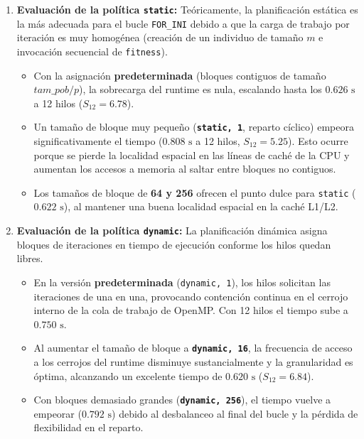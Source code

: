 \documentclass[12pt]{article}
\begin{document}
\begin{enumerate}
\begin{enumerate}
    \item \textbf{Evaluación de la política \texttt{static}:}
    Teóricamente, la planificación estática es la más adecuada para el bucle \texttt{FOR\_INI} debido a que la carga de trabajo por iteración es muy homogénea (creación de un individuo de tamaño $m$ e invocación secuencial de \texttt{fitness}). 
    \begin{itemize}
        \item Con la asignación \textbf{predeterminada} (bloques contiguos de tamaño $tam\_pob/p$), la sobrecarga del runtime es nula, escalando hasta los $0.626\text{ s}$ a 12 hilos ($S_{12} = 6.78$).
        \item Un tamaño de bloque muy pequeño (\textbf{\texttt{static, 1}}, reparto cíclico) empeora significativamente el tiempo ($0.808\text{ s}$ a 12 hilos, $S_{12} = 5.25$). Esto ocurre porque se pierde la localidad espacial en las líneas de caché de la CPU y aumentan los accesos a memoria al saltar entre bloques no contiguos.
        \item Los tamaños de bloque de \textbf{64 y 256} ofrecen el punto dulce para \texttt{static} ($0.622\text{ s}$), al mantener una buena localidad espacial en la caché L1/L2.
    \end{itemize}

    \item \textbf{Evaluación de la política \texttt{dynamic}:}
    La planificación dinámica asigna bloques de iteraciones en tiempo de ejecución conforme los hilos quedan libres.
    \begin{itemize}
        \item En la versión \textbf{predeterminada} (\texttt{dynamic, 1}), los hilos solicitan las iteraciones de una en una, provocando contención continua en el cerrojo interno de la cola de trabajo de OpenMP. Con 12 hilos el tiempo sube a $0.750\text{ s}$.
        \item Al aumentar el tamaño de bloque a \textbf{\texttt{dynamic, 16}}, la frecuencia de acceso a los cerrojos del runtime disminuye sustancialmente y la granularidad es óptima, alcanzando un excelente tiempo de $0.620\text{ s}$ ($S_{12} = 6.84$).
        \item Con bloques demasiado grandes (\textbf{\texttt{dynamic, 256}}), el tiempo vuelve a empeorar ($0.792\text{ s}$) debido al desbalanceo al final del bucle y la pérdida de flexibilidad en el reparto.
    \end{itemize}


\end{enumerate}
\end{enumerate}
\end{document}
